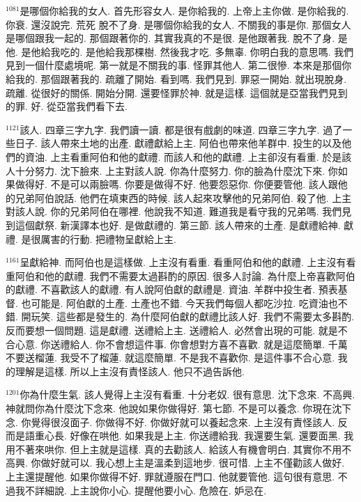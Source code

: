 \documentclass{book}
\begin{document}
$^{1081}$是哪個你給我的女人.
首先形容女人.
是你給我的.
上帝上主你做.
是你給我的.
你衰.
還沒說完.
荒死 脫不了身.
是哪個你給我的女人.
不關我的事是你.
那個女人是哪個跟我一起的.
那個跟著你的.
其實我真的不是很.
是他跟著我.
脫不了身.
是他.
是他給我吃的.
是他給我那棵樹.
然後我才吃.
多無辜.
你明白我的意思嗎.
我們見到一個什麼處境呢.
第一就是不關我的事.
怪罪其他人.
第二很慘.
本來是那個你給我的.
那個跟著我的.
疏離了開始.
看到嗎.
我們見到.
罪惡一開始.
就出現脫身.
疏離.
從很好的關係.
開始分開.
還要怪罪於神.
就是這樣.
這個就是亞當我們見到的罪.
好.
從亞當我們看下去.

$^{1121}$該人.
四章三字九字.
我們讀一讀.
都是很有戲劇的味道.
四章三字九字.
過了一些日子.
該人帶來土地的出產.
獻禮獻給上主.
阿伯也帶來他羊群中.
投生的以及他們的資油.
上主看重阿伯和他的獻禮.
而該人和他的獻禮.
上主卻沒有看重.
於是該人十分努力.
沈下臉來.
上主對該人說.
你為什麼努力.
你的臉為什麼沈下來.
你如果做得好.
不是可以兩臉嗎.
你要是做得不好.
他要怨惡你.
你便要管他.
該人跟他的兄弟阿伯說話.
他們在填東西的時候.
該人起來攻擊他的兄弟阿伯.
殺了他.
上主對該人說.
你的兄弟阿伯在哪裡.
他說我不知道.
難道我是看守我的兄弟嗎.
我們見到這個獻祭.
新漢譯本也好.
是做獻禮的.
第三節.
該人帶來的土產.
是獻禮給神.
獻禮.
是很厲害的行動.
把禮物呈獻給上主.

$^{1161}$呈獻給神.
而阿伯也是這樣做.
上主沒有看重.
看重阿伯和他的獻禮.
上主沒有看重阿伯和他的獻禮.
我們不需要太過斟酌的原因.
很多人討論.
為什麼上帝喜歡阿伯的獻禮.
不喜歡該人的獻禮.
有人說阿伯獻的獻禮是.
資油.
羊群中投生者.
預表基督.
也可能是.
阿伯獻的土產.
土產也不錯.
今天我們每個人都吃沙拉.
吃資油也不錯.
開玩笑.
這些都是發生的.
為什麼阿伯獻的獻禮比該人好.
我們不需要太多斟酌.
反而要想一個問題.
這是獻禮.
送禮給上主.
送禮給人.
必然會出現的可能.
就是不合心意.
你送禮給人.
你不會想這件事.
你會想對方喜不喜歡.
就是這麼簡單.
千萬不要送榴蓮.
我受不了榴蓮.
就這麼簡單.
不是我不喜歡你.
是這件事不合心意.
我的理解是這樣.
所以上主沒有責怪該人.
他只不過告訴他.

$^{1201}$你為什麼生氣.
該人覺得上主沒有看重.
十分老奴.
很有意思.
沈下念來.
不高興.
神就問你為什麼沈下念來.
他說如果你做得好.
第七節.
不是可以養念.
你現在沈下念.
你覺得很沒面子.
你做得不好.
你做好就可以養起念來.
上主沒有責怪該人.
反而是語重心長.
好像在哄他.
如果我是上主.
你送禮給我.
我還要生氣.
還要面黑.
我用不著來哄你.
但上主就是這樣.
真的去勸該人.
給該人有機會明白.
其實你不用不高興.
你做好就可以.
我心想上主是溫柔到這地步.
很可惜.
上主不僅勸該人做好.
上主還提醒他.
如果你做得不好.
罪就遵服在門口.
他就要管他.
這句很有意思.
不過我不詳細說.
上主說你小心.
提醒他要小心.
危險在.
妒忌在.
\end{document}
